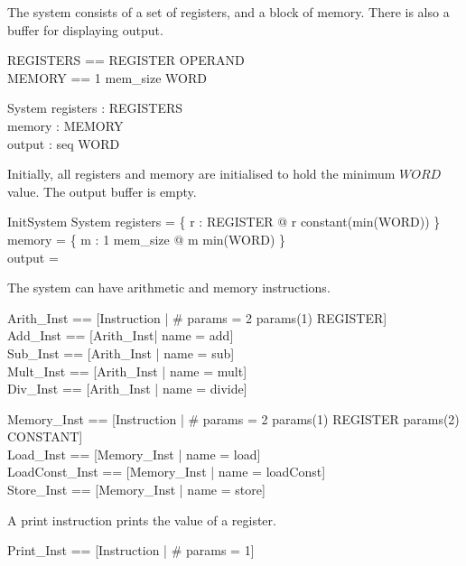 The system consists of a set of registers, and a block of
memory. There is also a buffer for displaying output.

\begin{zed}
    REGISTERS == REGISTER \fun OPERAND\\
    MEMORY == 1 \upto mem\_size \pfun WORD    
\end{zed}

\begin{schema}{System}
    registers : REGISTERS\\
    memory : MEMORY\\
    output : seq WORD
\end{schema}

Initially, all registers and memory are initialised to hold the
minimum $WORD$ value. The output buffer is empty.

\begin{schema}{InitSystem}
    System
\where
    registers = \{ r : REGISTER @ r \mapsto constant(min(WORD)) \}\\
    memory = \{ m : 1 \upto mem\_size @ m \mapsto min(WORD) \}\\
    output = \langle \rangle
\end{schema}

The system can have arithmetic and memory instructions.

\begin{zed}
    Arith\_Inst == [Instruction | \# params = 2 \land params(1) \in REGISTER]\\
    Add\_Inst == [Arith\_Inst| name = add]\\
    Sub\_Inst == [Arith\_Inst | name = sub]\\
    Mult\_Inst == [Arith\_Inst | name = mult]\\
    Div\_Inst == [Arith\_Inst | name = divide]
\end{zed}

\begin{zed}
    Memory\_Inst == [Instruction | \# params = 2 \land params(1) \in REGISTER \land params(2) \in CONSTANT]\\
    Load\_Inst == [Memory\_Inst | name = load]\\
    LoadConst\_Inst == [Memory\_Inst | name = loadConst]\\
    Store\_Inst == [Memory\_Inst | name = store]
\end{zed}

A print instruction prints the value of a register.

\begin{zed}
    Print\_Inst == [Instruction | \# params = 1]
\end{zed}


